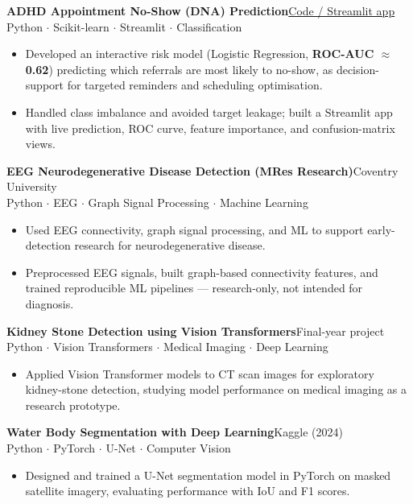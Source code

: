 \documentclass[a4paper,10pt]{article}
\newcommand{\entry}[4]{%
  \noindent\textbf{#1}\hfill{\color{muted}\small #2}\\[-0.2em]
  {\color{accent}\small #3}\\[0.1em]
  #4
}
\begin{document}
\entry{ADHD Appointment No-Show (DNA) Prediction}
      {\href{https://github.com/Talikamuhib}{Code / Streamlit app}}
      {Python $\cdot$ Scikit-learn $\cdot$ Streamlit $\cdot$ Classification}
      {\begin{itemize}
        \item Developed an interactive risk model (Logistic Regression, \textbf{ROC-AUC $\approx$ 0.62})
              predicting which referrals are most likely to no-show, as decision-support for
              targeted reminders and scheduling optimisation.
        \item Handled class imbalance and avoided target leakage; built a Streamlit app with
              live prediction, ROC curve, feature importance, and confusion-matrix views.
      \end{itemize}}
\vspace{0.5em}

\entry{EEG Neurodegenerative Disease Detection (MRes Research)}
      {Coventry University}
      {Python $\cdot$ EEG $\cdot$ Graph Signal Processing $\cdot$ Machine Learning}
      {\begin{itemize}
        \item Used EEG connectivity, graph signal processing, and ML to support early-detection
              research for neurodegenerative disease.
        \item Preprocessed EEG signals, built graph-based connectivity features, and trained
              reproducible ML pipelines --- research-only, not intended for diagnosis.
      \end{itemize}}
\vspace{0.5em}

\entry{Kidney Stone Detection using Vision Transformers}
      {Final-year project}
      {Python $\cdot$ Vision Transformers $\cdot$ Medical Imaging $\cdot$ Deep Learning}
      {\begin{itemize}
        \item Applied Vision Transformer models to CT scan images for exploratory kidney-stone
              detection, studying model performance on medical imaging as a research prototype.
      \end{itemize}}
\vspace{0.5em}

\entry{Water Body Segmentation with Deep Learning}
      {Kaggle (2024)}
      {Python $\cdot$ PyTorch $\cdot$ U-Net $\cdot$ Computer Vision}
      {\begin{itemize}
        \item Designed and trained a U-Net segmentation model in PyTorch on masked satellite
              imagery, evaluating performance with IoU and F1 scores.
      \end{itemize}}
\vspace{0.5em}
\end{document}
